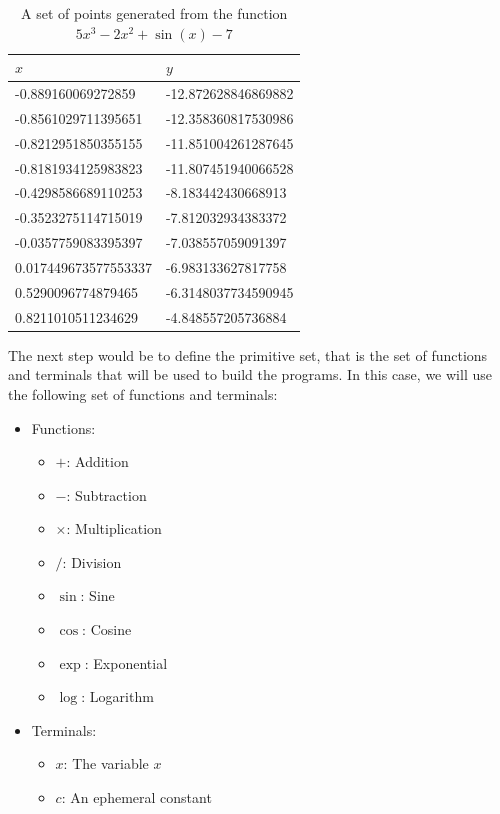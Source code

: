   \begin{table}[ht!]
    \centering
    \begin{tabular}{|l|l|}
      \hline
      \(x\) & \(y\) \\
      \hline
      \hline
      -0.889160069272859    & -12.872628846869882 \\
      \hline
      -0.8561029711395651   & -12.358360817530986 \\
      \hline
      -0.8212951850355155   & -11.851004261287645 \\
      \hline
      -0.8181934125983823   & -11.807451940066528 \\
      \hline
      -0.4298586689110253   & -8.183442430668913  \\
      \hline
      -0.3523275114715019   & -7.812032934383372  \\
      \hline
      -0.0357759083395397   & -7.038557059091397  \\
      \hline
      0.017449673577553337  & -6.983133627817758  \\
      \hline
      0.5290096774879465    & -6.3148037734590945 \\
      \hline
      0.8211010511234629    & -4.848557205736884  \\
      \hline
    \end{tabular}
    \caption{
      A set of points generated from the function \(5x^3 - 2x^2 + \sin(x) - 7\)
    }
    \label{tab:genetic_programming:representation:points}
  \end{table}

  The next step would be to define the primitive set, that is the set of
  functions and terminals that will be used to build the programs.
  In this case, we will use the following set of functions and terminals:

  \begin{itemize}
    \item Functions:
      \begin{itemize}
        \item \(+\): Addition
        \item \(-\): Subtraction
        \item \(\times\): Multiplication
        \item \(/\): Division
        \item \(\sin\): Sine
        \item \(\cos\): Cosine
        \item \(\exp\): Exponential
        \item \(\log\): Logarithm
      \end{itemize}
    \item Terminals:
      \begin{itemize}
        \item \(x\): The variable \(x\)
        \item \(c\): An ephemeral constant
      \end{itemize}
  \end{itemize}

